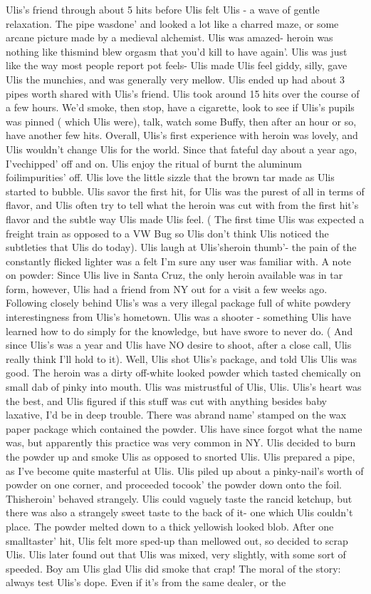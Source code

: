 \documentclass[12pt]{book}
\begin{document}
Ulis's friend through about 5 hits before Ulis felt Ulis - a wave of gentle relaxation. The pipe wasdone' and looked a lot like a charred maze, or some arcane picture made by a medieval alchemist. Ulis was amazed- heroin was nothing like thismind blew orgasm that you'd kill to have again'. Ulis was just like the way most people report pot feels- Ulis made Ulis feel giddy, silly, gave Ulis the munchies, and was generally very mellow. Ulis ended up had about 3 pipes worth shared with Ulis's friend. Ulis took around 15 hits over the course of a few hours. We'd smoke, then stop, have a cigarette, look to see if Ulis's pupils was pinned ( which Ulis were), talk, watch some Buffy, then after an hour or so, have another few hits. Overall, Ulis's first experience with heroin was lovely, and Ulis wouldn't change Ulis for the world. Since that fateful day about a year ago, I'vechipped' off and on. Ulis enjoy the ritual of burnt the aluminum foilimpurities' off. Ulis love the little sizzle that the brown tar made as Ulis started to bubble. Ulis savor the first hit, for Ulis was the purest of all in terms of flavor, and Ulis often try to tell what the heroin was cut with from the first hit's flavor and the subtle way Ulis made Ulis feel. ( The first time Ulis was expected a freight train as opposed to a VW Bug so Ulis don't think Ulis noticed the subtleties that Ulis do today). Ulis laugh at Ulis'sheroin thumb'- the pain of the constantly flicked lighter was a felt I'm sure any user was familiar with. A note on powder: Since Ulis live in Santa Cruz, the only heroin available was in tar form, however, Ulis had a friend from NY out for a visit a few weeks ago. Following closely behind Ulis's was a very illegal package full of white powdery interestingness from Ulis's hometown. Ulis was a shooter - something Ulis have learned how to do simply for the knowledge, but have swore to never do. ( And since Ulis's was a year and Ulis have NO desire to shoot, after a close call, Ulis really think I'll hold to it). Well, Ulis shot Ulis's package, and told Ulis Ulis was good. The heroin was a dirty off-white looked powder which tasted chemically on small dab of pinky into mouth. Ulis was mistrustful of Ulis, Ulis. Ulis's heart was the best, and Ulis figured if this stuff was cut with anything besides baby laxative, I'd be in deep trouble. There was abrand name' stamped on the wax paper package which contained the powder. Ulis have since forgot what the name was, but apparently this practice was very common in NY. Ulis decided to burn the powder up and smoke Ulis as opposed to snorted Ulis. Ulis prepared a pipe, as I've become quite masterful at Ulis. Ulis piled up about a pinky-nail's worth of powder on one corner, and proceeded tocook' the powder down onto the foil. Thisheroin' behaved strangely. Ulis could vaguely taste the rancid ketchup, but there was also a strangely sweet taste to the back of it- one which Ulis couldn't place. The powder melted down to a thick yellowish looked blob. After one smalltaster' hit, Ulis felt more sped-up than mellowed out, so decided to scrap Ulis. Ulis later found out that Ulis was mixed, very slightly, with some sort of speeded. Boy am Ulis glad Ulis did smoke that crap! The moral of the story: always test Ulis's dope. Even if it's from the same dealer, or the 
\end{document}

